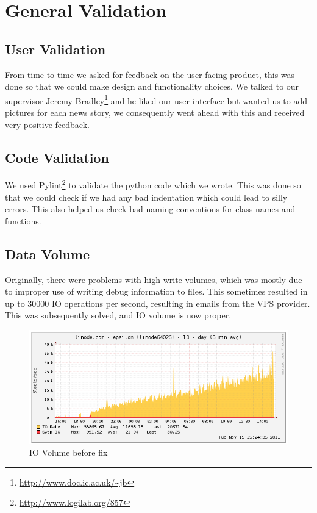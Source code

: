 \documentclass[a4paper,12pt]{article}
\begin{document}
  
	
	\section{General Validation}
	
		\subsection{User Validation}
  	  From time to time we asked for feedback on the user facing product, this was done so that we could make design and functionality choices. We talked to our supervisor Jeremy Bradley\footnote{\url{http://www.doc.ic.ac.uk/~jb}} and he liked our user interface but wanted us to add pictures for each news story, we consequently went ahead with this and received very positive feedback.
	
	\subsection{Code Validation}
	We used Pylint\footnote{\url{http://www.logilab.org/857}} to validate the python code which we wrote. This was done so that we could check if we had any bad indentation which could lead to silly errors. This also helped us check bad naming conventions for class names and functions.
	

		\subsection{Data Volume}

		Originally, there were problems with high write volumes, which was mostly due to improper use of writing debug information to files. This sometimes resulted in up to 30000 IO operations per second, resulting in emails from the VPS provider. This was subsequently solved, and IO volume is now proper.
	
		\begin{figure}[ht!]
					\centering
						\includegraphics[scale=0.4]{io_chart.png}
					\caption{IO Volume before fix}
		\end{figure}
	
\end{document}
